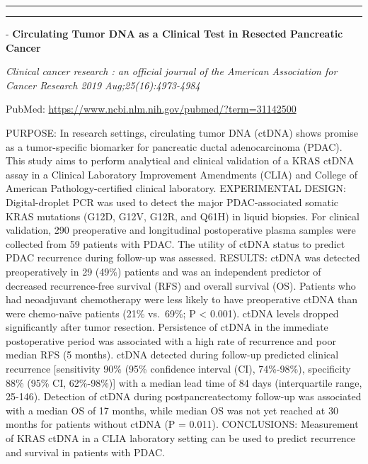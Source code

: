 \documentclass[]{article}
\begin{document}
{}

\begin{center}\rule{0.5\linewidth}{\linethickness}\end{center}

\begin{center}\rule{0.5\linewidth}{\linethickness}\end{center}

 - \textbf{Circulating Tumor DNA as a Clinical Test in Resected
Pancreatic Cancer}

\emph{Clinical cancer research : an official journal of the American
Association for Cancer Research 2019 Aug;25(16):4973-4984}

PubMed: \url{https://www.ncbi.nlm.nih.gov/pubmed/?term=31142500}

PURPOSE: In research settings, circulating tumor DNA (ctDNA) shows
promise as a tumor-specific biomarker for pancreatic ductal
adenocarcinoma (PDAC). This study aims to perform analytical and
clinical validation of a KRAS ctDNA assay in a Clinical Laboratory
Improvement Amendments (CLIA) and College of American
Pathology-certified clinical laboratory. EXPERIMENTAL DESIGN:
Digital-droplet PCR was used to detect the major PDAC-associated somatic
KRAS mutations (G12D, G12V, G12R, and Q61H) in liquid biopsies. For
clinical validation, 290 preoperative and longitudinal postoperative
plasma samples were collected from 59 patients with PDAC. The utility of
ctDNA status to predict PDAC recurrence during follow-up was assessed.
RESULTS: ctDNA was detected preoperatively in 29 (49\%) patients and was
an independent predictor of decreased recurrence-free survival (RFS) and
overall survival (OS). Patients who had neoadjuvant chemotherapy were
less likely to have preoperative ctDNA than were chemo-naïve patients
(21\% vs.~69\%; P \textless{} 0.001). ctDNA levels dropped significantly
after tumor resection. Persistence of ctDNA in the immediate
postoperative period was associated with a high rate of recurrence and
poor median RFS (5 months). ctDNA detected during follow-up predicted
clinical recurrence {[}sensitivity 90\% (95\% confidence interval (CI),
74\%-98\%), specificity 88\% (95\% CI, 62\%-98\%){]} with a median lead
time of 84 days (interquartile range, 25-146). Detection of ctDNA during
postpancreatectomy follow-up was associated with a median OS of 17
months, while median OS was not yet reached at 30 months for patients
without ctDNA (P = 0.011). CONCLUSIONS: Measurement of KRAS ctDNA in a
CLIA laboratory setting can be used to predict recurrence and survival
in patients with PDAC.
\end{document}
